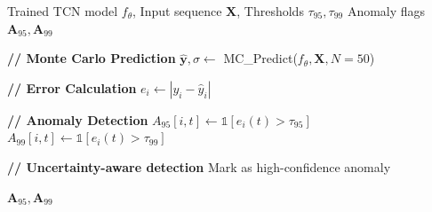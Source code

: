 \begin{algorithm}
\caption{Stochastic TCN-based Anomaly Detection}
\begin{algorithmic}[1]
\REQUIRE Trained TCN model $f_{\theta}$, Input sequence $\mathbf{X}$, Thresholds $\tau_{95}, \tau_{99}$
\ENSURE Anomaly flags $\mathbf{A}_{95}, \mathbf{A}_{99}$

\STATE \textbf{// Monte Carlo Prediction}
\STATE $\hat{\mathbf{y}}, \sigma \leftarrow$ MC\_Predict($f_{\theta}, \mathbf{X}, N=50$)

\STATE \textbf{// Error Calculation}
    \STATE $e_i \leftarrow |y_i - \hat{y}_i|$
\ENDFOR

\STATE \textbf{// Anomaly Detection}
    \STATE $A_{95}[i,t] \leftarrow \mathbb{1}[e_i(t) > \tau_{95}]$
    \STATE $A_{99}[i,t] \leftarrow \mathbb{1}[e_i(t) > \tau_{99}]$
    
    \STATE \textbf{// Uncertainty-aware detection}
        \STATE Mark as high-confidence anomaly
    \ENDIF
\ENDFOR

\RETURN $\mathbf{A}_{95}, \mathbf{A}_{99}$
\end{algorithmic}
\end{algorithm}